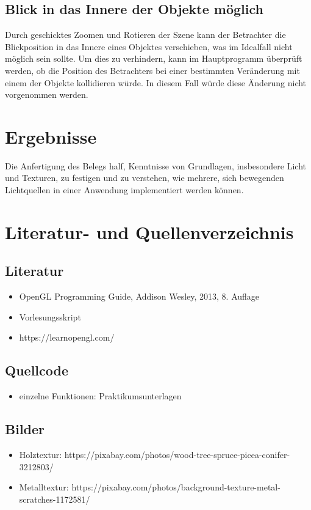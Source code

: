 \documentclass{scrartcl}
\begin{document}
        \subsection{Blick in das Innere der Objekte möglich}
        Durch geschicktes Zoomen und Rotieren der Szene kann der Betrachter die 
        Blickposition in das Innere eines Objektes verschieben, was im Idealfall nicht 
        möglich sein sollte.
        Um dies zu verhindern, kann im Hauptprogramm überprüft werden, ob die Position 
        des Betrachters bei einer bestimmten Veränderung mit einem der Objekte kollidieren würde. 
        In diesem Fall würde diese Änderung nicht vorgenommen werden.
    \newpage
    \section{Ergebnisse}
        Die Anfertigung des Belegs half, Kenntnisse von Grundlagen, insbesondere Licht und Texturen, zu festigen und zu verstehen,
        wie mehrere, sich bewegenden Lichtquellen in einer Anwendung implementiert werden können.
    \newpage    

    \section{Literatur- und Quellenverzeichnis}
        \subsection{Literatur}
        \begin{itemize}
            \item OpenGL Programming Guide, Addison Wesley, 2013, 8. Auflage
            \item Vorlesungsskript
            \item https://learnopengl.com/
        \end{itemize}
        \subsection{Quellcode}
        \begin{itemize}
        \item einzelne Funktionen: Praktikumsunterlagen
        \end{itemize}
        \subsection{Bilder}
        \begin{itemize}
        \item Holztextur: https://pixabay.com/photos/wood-tree-spruce-picea-conifer-3212803/
        \item Metalltextur: https://pixabay.com/photos/background-texture-metal-scratches-1172581/
        \end{itemize}
\end{document}

